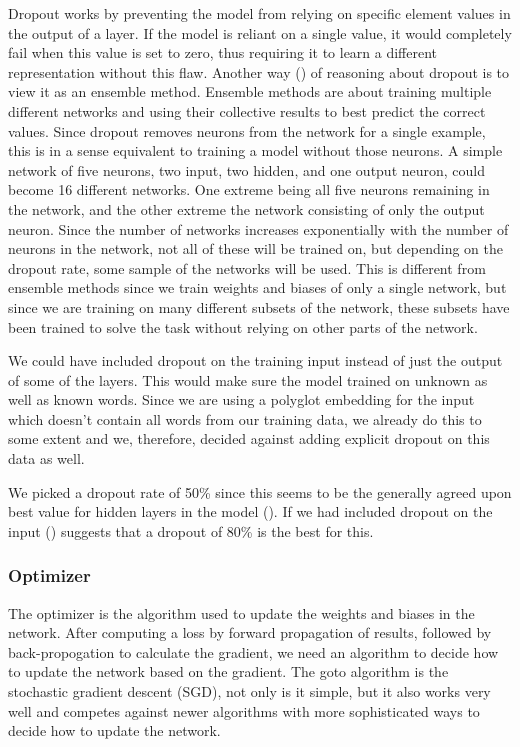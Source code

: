 Dropout works by preventing the model from relying on specific element values in
the output of a layer. If the model is reliant on a single value, it would
completely fail when this value is set to zero, thus requiring it to learn a
different representation without this flaw. Another way
(\cite{goodfellow2016deep}) of reasoning about dropout is to view it as an
ensemble method. Ensemble methods are about training multiple different networks
and using their collective results to best predict the correct values. Since
dropout removes neurons from the network for a single example, this is in a
sense equivalent to training a model without those neurons. A simple network of
five neurons, two input, two hidden, and one output neuron, could become 16
different networks. One extreme being all five neurons remaining in the network,
and the other extreme the network consisting of only the output neuron. Since
the number of networks increases exponentially with the number of neurons in the
network, not all of these will be trained on, but depending on the dropout rate,
some sample of the networks will be used. This is different from ensemble
methods since we train weights and biases of only a single network, but since we
are training on many different subsets of the network, these subsets have been
trained to solve the task without relying on other parts of the network. 

We could have included dropout on the training input instead of just the output
of some of the layers. This would make sure the model trained on unknown as well
as known words. Since we are using a polyglot embedding for the input which
doesn't contain all words from our training data, we already do this to some
extent and we, therefore, decided against adding explicit dropout on this data
as well.

We picked a dropout rate of 50\% since this seems to be the generally agreed
upon best value for hidden layers in the model (\cite{yang2018design}). If we
had included dropout on the input (\cite{goodfellow2016deep}) suggests that a
dropout of 80\% is the best for this.


\subsubsection{Optimizer}

The optimizer is the algorithm used to update the weights and biases in the
network. After computing a loss by forward propagation of results, followed by
back-propogation to calculate the gradient, we need an algorithm to decide how
to update the network based on the gradient. The goto algorithm is the
stochastic gradient descent (SGD), not only is it simple, but it also works very
well and competes against newer algorithms with more sophisticated ways to
decide how to update the network.

